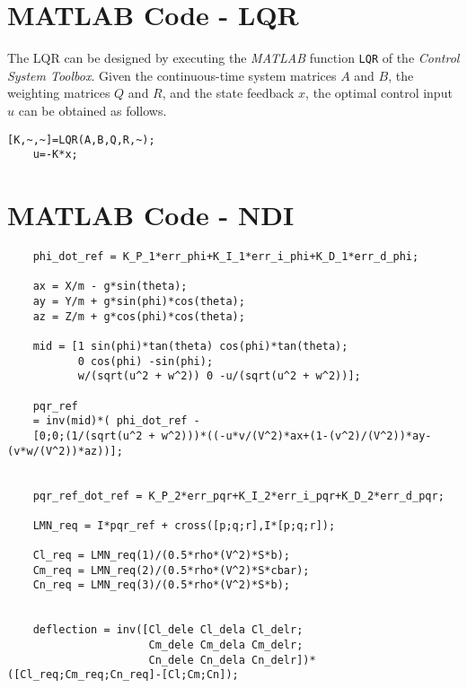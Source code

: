 \documentclass[a4paper, 12pt]{report}
\begin{document}
\appendix

\chapter{MATLAB Code - LQR}

The LQR can be designed by executing the \textit{MATLAB} function \texttt{LQR} of the \textit{Control System Toolbox}.
Given the continuous-time system matrices $A$ and $B$, the weighting matrices $Q$ and $R$, and the state feedback $x$, the optimal control input $u$ can be obtained as follows.
\begin{lstlisting}[style=matlabFrameTB, gobble=4]
	[K,~,~]=LQR(A,B,Q,R,~);
	u=-K*x;
\end{lstlisting}

\chapter{MATLAB Code - NDI}
\begin{verbatim}
	phi_dot_ref = K_P_1*err_phi+K_I_1*err_i_phi+K_D_1*err_d_phi;
	
	ax = X/m - g*sin(theta);
	ay = Y/m + g*sin(phi)*cos(theta);
	az = Z/m + g*cos(phi)*cos(theta);
	
	mid = [1 sin(phi)*tan(theta) cos(phi)*tan(theta);
	       0 cos(phi) -sin(phi);
	       w/(sqrt(u^2 + w^2)) 0 -u/(sqrt(u^2 + w^2))];
	       
	pqr_ref 
	= inv(mid)*( phi_dot_ref - 
	[0;0;(1/(sqrt(u^2 + w^2)))*((-u*v/(V^2)*ax+(1-(v^2)/(V^2))*ay-(v*w/(V^2))*az))];       
	

	pqr_ref_dot_ref = K_P_2*err_pqr+K_I_2*err_i_pqr+K_D_2*err_d_pqr;
	
	LMN_req = I*pqr_ref + cross([p;q;r],I*[p;q;r]);
	
	Cl_req = LMN_req(1)/(0.5*rho*(V^2)*S*b);
	Cm_req = LMN_req(2)/(0.5*rho*(V^2)*S*cbar);
	Cn_req = LMN_req(3)/(0.5*rho*(V^2)*S*b);
	
	
	deflection = inv([Cl_dele Cl_dela Cl_delr;
	                  Cm_dele Cm_dela Cm_delr;
	                  Cn_dele Cn_dela Cn_delr])*([Cl_req;Cm_req;Cn_req]-[Cl;Cm;Cn]);
	
\end{verbatim}

	\printbibliography
	
\end{document}
